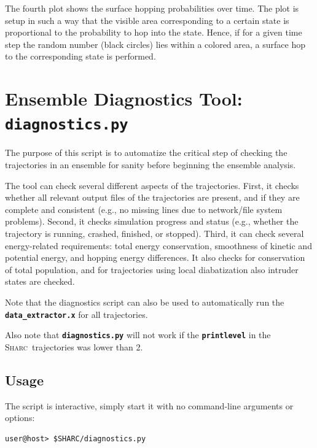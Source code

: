 \documentclass[a4paper,10pt,DIV=15,openany]{scrbook}
\newcommand{\sharc}{\textsc{Sharc}}
\newcommand{\ttt}[1]{\textbf{\texttt{#1}}}
\begin{document}
The fourth plot shows the surface hopping probabilities over time. The plot is setup in such a way that the visible area corresponding to a certain state is proportional to the probability to hop into the state. Hence, if for a given time step the random number (black circles) lies within a colored area, a surface hop to the corresponding state is performed.






\section{Ensemble Diagnostics Tool: \ttt{diagnostics.py}}\label{sec:diagnostics.py}

The purpose of this script is to automatize the critical step of checking the trajectories in an ensemble for sanity before beginning the ensemble analysis.

The tool can check several different aspects of the trajectories.
First, it checks whether all relevant output files of the trajectories are present, and if they are complete and consistent (e.g., no missing lines due to network/file system problems).
Second, it checks simulation progress and status (e.g., whether the trajectory is running, crashed, finished, or stopped).
Third, it can check several energy-related requirements: total energy conservation, smoothness of kinetic and potential energy, and hopping energy differences.
It also checks for conservation of total population, and for trajectories using local diabatization also intruder states are checked.

Note that the diagnostics script can also be used to automatically run the \ttt{data\_extractor.x} for all trajectories.

Also note that \ttt{diagnostics.py} will not work if the \ttt{printlevel} in the \sharc\ trajectories was lower than 2.

\subsection{Usage}

The script is interactive, simply start it with no command-line arguments or options:
\begin{verbatim}
user@host> $SHARC/diagnostics.py
\end{verbatim}
\end{document}
